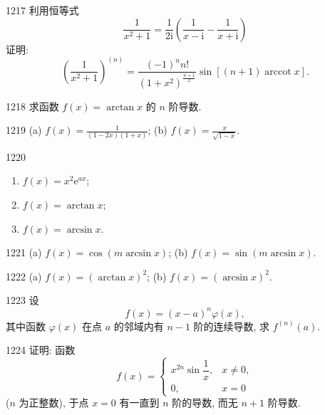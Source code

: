 
\begin{prob}[L]{1217}
利用恒等式
\[
\frac{1}{x^2 + 1} = \frac{1}{2\mathrm{i}}\left(\frac{1}{x - \mathrm{i}} - \frac{1}{x + \mathrm{i}}\right)
\]
证明:
\[
\left(\frac{1}{x^2 + 1}\right)^{(n)} = \frac{(-1)^n n!}{(1 + x^2)^{\frac{n+1}{2}}}\sin[(n + 1)\operatorname{arccot} x].
\]
\end{prob}

\begin{prob}[M]{1218}
求函数 $f(x) = \arctan x$ 的 $n$ 阶导数.
\end{prob}


\begin{prob}[M]{1219}
(a) $f(x) = \frac{1}{(1 - 2x)(1 + x)}$; \qquad (b) $f(x) = \frac{x}{\sqrt{1 - x}}$.
\end{prob}

\begin{prob}[L]{1220}
\begin{enumerate}[label=(\alph*), itemsep=2pt, topsep=3pt]
  \item $f(x) = x^2\mathrm{e}^{ax}$;
  \item $f(x) = \arctan x$;
  \item $f(x) = \arcsin x$.
\end{enumerate}
\end{prob}

\begin{prob}[M]{1221}
(a) $f(x) = \cos(m\arcsin x)$; \qquad (b) $f(x) = \sin(m\arcsin x)$.
\end{prob}

\begin{prob}[M]{1222}
(a) $f(x) = (\arctan x)^2$; \qquad (b) $f(x) = (\arcsin x)^2$.
\end{prob}

\begin{prob}[M]{1223}
设
\[
f(x) = (x - a)^n\varphi(x),
\]
其中函数 $\varphi(x)$ 在点 $a$ 的邻域内有 $n - 1$ 阶的连续导数, 求 $f^{(n)}(a)$.
\end{prob}

\begin{prob}[M]{1224}
证明: 函数
\[
f(x) = \begin{cases}
x^{2n}\sin\dfrac{1}{x}, & x \neq 0, \\
0, & x = 0
\end{cases}
\]
($n$ 为正整数), 于点 $x = 0$ 有一直到 $n$ 阶的导数, 而无 $n + 1$ 阶导数.
\end{prob}


